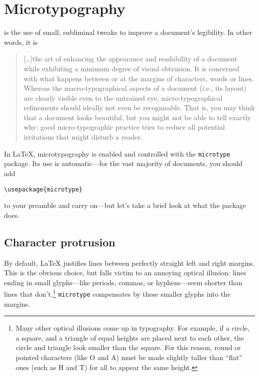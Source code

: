\chapter{Microtypography}
\label{microtype}

 is the use of small, subliminal tweaks to improve
a document's legibility.
In other words, it is
\begin{quote}
[\dots]the art of enhancing the appearance and readability of a
document while exhibiting a minimum degree of visual obtrusion.
It is concerned with what happens between or at the margins of characters,
words or lines. Whereas the macro-typographical aspects of a document
(i.e., its layout) are clearly visible even to the untrained eye,
micro-typographical refinements should ideally not even be recognisable.
That is, you may think that a document looks beautiful, but you
might not be able to tell exactly why: good micro-typographic practice tries to
reduce all potential irritations that might disturb a reader.\punckern{}
\end{quote}

In \LaTeX{}, microtypography is enabled and controlled with the
\texttt{microtype} package.
Its use is automatic---for the vast majority of documents, you should add
\begin{leftfigure}
\begin{lstlisting}
\usepackage{microtype}
\end{lstlisting}
\end{leftfigure}
to your preamble and carry on---but let's take a brief look at what the package
does.

\section{Character protrusion}

By default, \LaTeX{} justifies lines between perfectly straight
left and right margins.
This is the obvious choice,
but falls victim to an annoying optical illusion:
lines ending in small glyphs---like periods, commas,
or hyphens---seem shorter than lines that
don't.\punckern\footnote{Many other optical illusions come up in typography.
For example, if a circle, a square, and a triangle
of equal heights are placed next to each other,
the circle and triangle look smaller than the square.
For this reason, round or pointed characters (like O and A) must
be made slightly taller than ``flat'' ones (such as H and T) for all
to appear the same height.\punckern{}}
\texttt{microtype} compensates by  these smaller glyphs
into the margins.

